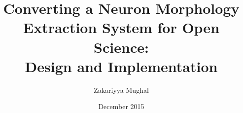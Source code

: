 \title{\bf \large Converting a Neuron Morphology Extraction
System for Open Science:\\Design and Implementation}
\author{Zakariyya Mughal}
\date{December 2015}



